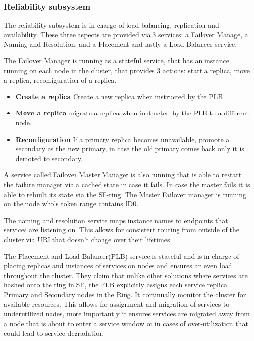 \documentclass[a4paper,10pt,titlepage]{report}
\begin{document}
    \subsubsection{Reliability subsystem}
    The reliability subsystem is in charge of load balancing, replication and availability. These three aspects are provided via 3 services: a Failover Manage, a Naming and Resolution, and a Placement and lastly a Load Balancer service.\\
    \vspace{5mm}

    The Failover Manager is running as a stateful service, that has an instance running on each node in the cluster, that provides 3 actions: start a replica, move a replica, reconfiguration of a replica.\\
    \vspace{5mm}

    \begin{itemize}
        \item \textbf{Create a replica} Create a new replica when instructed by the PLB
        \item \textbf{Move a replica} migrate a replica when instructed by the PLB to a different node.
        \item \textbf{Reconfiguration} If a primary replica becomes unavailable, promote a secondary as the new primary, in case the old primary comes back only it is demoted to secondary.
    \end{itemize}

    A service called Failover Master Manager is also running that is able to restart the failure manager via a cached state in case it fails. In case the master fails it is able to rebuilt its state via the SF-ring. The Master Failover manager is running on the node who's token range contains ID0.\\
    \vspace{5mm}

    The naming and resolution service maps instance names to endpoints that services are listening on. This allows for consistent routing from outside of the cluster via URI that doesn't change over their lifetimes.\\
    \vspace{5mm}

    The Placement and Load Balancer(PLB) service is stateful and is in charge of placing replicas and instances of services on nodes and ensures an even load throughout the cluster. They claim that unlike other solutions where services are hashed onto the ring in SF, the PLB explicitly assigns each service replica Primary and Secondary nodes in the Ring. It continually monitor the cluster for available resources. This allows for assignment and migration of services to underutilized nodes,  more importantly it ensures services are migrated away from a node that is about to enter a service window or in cases of over-utilization that could lead to service degradation\\
    \vspace{5mm}
\end{document}

